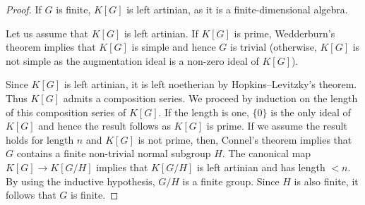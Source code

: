 \begin{proof}
	If $G$ is finite, $K[G]$ is left artinian, as it is a finite-dimensional algebra.
	
	Let us assume that $K[G]$ is left artinian. 
	If $K[G]$ is prime, Wedderburn's theorem implies that 
	$K[G]$ is simple and hence 
	$G$ is trivial (otherwise, $K[G]$ is not simple as the augmentation ideal 
	is a non-zero ideal of $K[G]$).

	Since $K[G]$ is left artinian, it is left noetherian by Hopkins--Levitzky's theorem. Thus $K[G]$
	admits a composition series. We proceed by induction on the length of this composition series of 
	$K[G]$. If the length is one, $\{0\}$ is the only ideal of $K[G]$ and hence the result follows as 
	$K[G]$ is prime. If we assume the result holds for length $n$ and $K[G]$ is not prime, then, 
	Connel's theorem implies that $G$ contains a finite non-trivial normal subgroup $H$. The canonical map
	$K[G]\to K[G/H]$ implies that $K[G/H]$ is left artinian and has length 
	$<n$. By using the inductive hypothesis, $G/H$
	is a finite group. Since $H$ is also finite, it follows that $G$ is finite. 
\end{proof}


